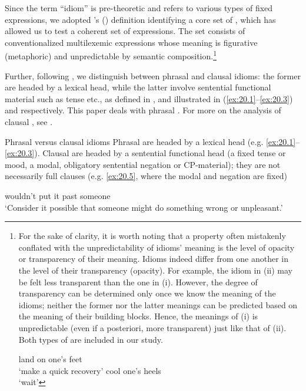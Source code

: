 \documentclass[output=paper]{langsci/langscibook}
\begin{document}
Since the term ``idiom'' is pre-theoretic and refers to various types of fixed
expressions, we adopted \citeauthor{HorSil2017}’s
(\citeyear{HorSil2017,HorSil2019}) definition identifying a core set of
, which has allowed us to test a coherent set of expressions. The
set consists of conventionalized multilexemic expressions whose meaning is
figurative (metaphoric) and unpredictable by semantic composition.\footnote{For
    the sake of clarity, it is worth noting that a property often mistakenly
    conflated with the unpredictability of idioms’ meaning is the level of
    opacity or transparency of their meaning. Idioms indeed differ from one
    another in the level of their transparency (opacity).  For example, the
    idiom in (ii) may be felt less transparent than the one in (i).  However,
    the degree of transparency can be determined only once we know the meaning
    of the idioms; neither the former nor the latter meanings can be predicted
    based on the meaning of their building blocks. Hence, the meanings of (i)
    is unpredictable (even if a posteriori, more transparent) just like that of
    (ii). Both types of  are included in our study.

    \ea     land on one’s feet\\
            \glt ‘make a quick recovery’
        \ex cool one’s heels\\
            \glt \enquote*{wait}
    \z}

Further, following \textcite{HorSil2017,HorSil2019}, we distinguish between\linebreak
phrasal and clausal idioms: the former are headed by a lexical head, while the
latter involve sentential functional material such as tense etc., as defined in
, and illustrated in (\ref{ex:20.1}--\ref{ex:20.3}) and 
respectively.  This paper deals with phrasal . For more on the
analysis of clausal , see \textcite{HorSil2019}.

\ea\label{ex:20.4}Phrasal versus clausal idioms
    \ea Phrasal  are headed by a lexical head (e.g. \ref{ex:20.1}--\ref{ex:20.3}).
    \ex Clausal  are headed by a sentential functional head (a fixed
    tense or mood, a modal, obligatory sentential negation or
    CP-material); they are not necessarily full clauses (e.g.
    \ref{ex:20.5}, where the modal and negation are
    fixed)
    \z
\z

\ea\label{ex:20.5}
    wouldn’t put it past  someone\\
    \glt ‘Consider it possible that someone might do something wrong or unpleasant.’
\z
\end{document}
